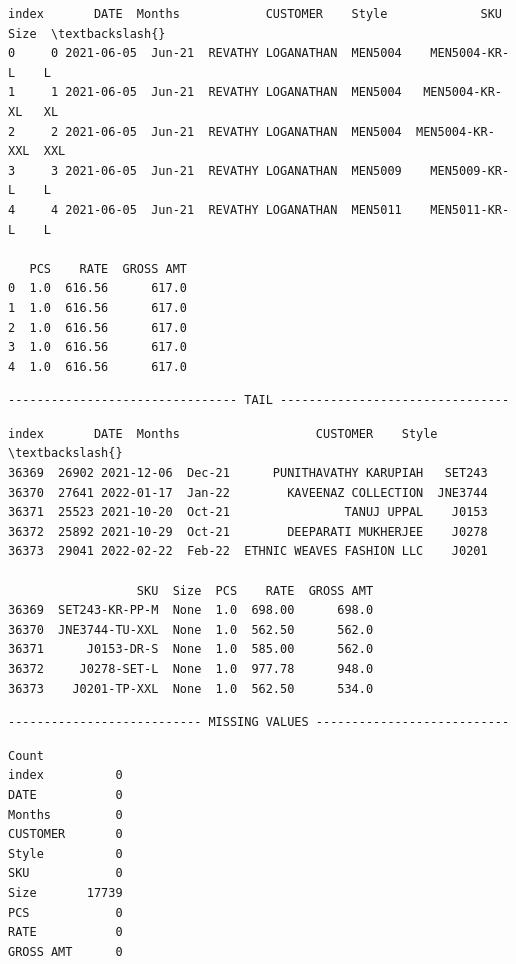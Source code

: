\documentclass[11pt]{article}
\begin{document}
    
    \begin{Verbatim}[commandchars=\\\{\}]
  index       DATE  Months            CUSTOMER    Style             SKU Size  \textbackslash{}
0     0 2021-06-05  Jun-21  REVATHY LOGANATHAN  MEN5004    MEN5004-KR-L    L   
1     1 2021-06-05  Jun-21  REVATHY LOGANATHAN  MEN5004   MEN5004-KR-XL   XL   
2     2 2021-06-05  Jun-21  REVATHY LOGANATHAN  MEN5004  MEN5004-KR-XXL  XXL   
3     3 2021-06-05  Jun-21  REVATHY LOGANATHAN  MEN5009    MEN5009-KR-L    L   
4     4 2021-06-05  Jun-21  REVATHY LOGANATHAN  MEN5011    MEN5011-KR-L    L   

   PCS    RATE  GROSS AMT  
0  1.0  616.56      617.0  
1  1.0  616.56      617.0  
2  1.0  616.56      617.0  
3  1.0  616.56      617.0  
4  1.0  616.56      617.0  
    \end{Verbatim}

    
    \begin{Verbatim}[commandchars=\\\{\}]
-------------------------------- TAIL --------------------------------
    \end{Verbatim}

    
    \begin{Verbatim}[commandchars=\\\{\}]
       index       DATE  Months                   CUSTOMER    Style  \textbackslash{}
36369  26902 2021-12-06  Dec-21      PUNITHAVATHY KARUPIAH   SET243   
36370  27641 2022-01-17  Jan-22        KAVEENAZ COLLECTION  JNE3744   
36371  25523 2021-10-20  Oct-21                TANUJ UPPAL    J0153   
36372  25892 2021-10-29  Oct-21        DEEPARATI MUKHERJEE    J0278   
36373  29041 2022-02-22  Feb-22  ETHNIC WEAVES FASHION LLC    J0201   

                  SKU  Size  PCS    RATE  GROSS AMT  
36369  SET243-KR-PP-M  None  1.0  698.00      698.0  
36370  JNE3744-TU-XXL  None  1.0  562.50      562.0  
36371      J0153-DR-S  None  1.0  585.00      562.0  
36372     J0278-SET-L  None  1.0  977.78      948.0  
36373    J0201-TP-XXL  None  1.0  562.50      534.0  
    \end{Verbatim}

    
    \begin{Verbatim}[commandchars=\\\{\}]
--------------------------- MISSING VALUES ---------------------------
    \end{Verbatim}

    
    \begin{Verbatim}[commandchars=\\\{\}]
           Count
index          0
DATE           0
Months         0
CUSTOMER       0
Style          0
SKU            0
Size       17739
PCS            0
RATE           0
GROSS AMT      0
    \end{Verbatim}
\end{document}
